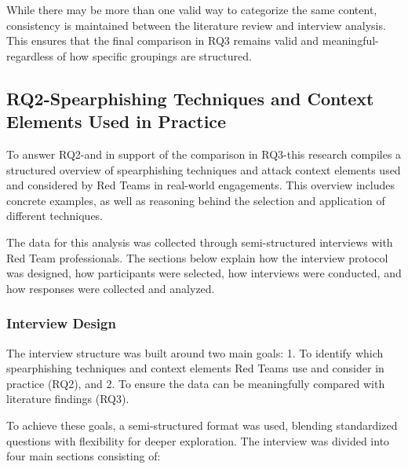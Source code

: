 While there may be more than one valid way to categorize the same content, consistency is maintained between the literature review and interview analysis. This ensures that the final comparison in RQ3 remains valid and meaningful-regardless of how specific groupings are structured.

\subsection{RQ2-Spearphishing Techniques and Context Elements Used in Practice}
To answer RQ2-and in support of the comparison in RQ3-this research compiles a structured overview of spearphishing techniques and attack context elements used and considered by Red Teams in real-world engagements. This overview includes concrete examples, as well as reasoning behind the selection and application of different techniques.

The data for this analysis was collected through semi-structured interviews with Red Team professionals. The sections below explain how the interview protocol was designed, how participants were selected, how interviews were conducted, and how responses were collected and analyzed.

\subsubsection{Interview Design}
The interview structure was built around two main goals:
1. To identify which spearphishing techniques and context elements Red Teams use and consider in practice (RQ2), and
2. To ensure the data can be meaningfully compared with literature findings (RQ3).

To achieve these goals, a semi-structured format was used, blending standardized questions with flexibility for deeper exploration. The interview was divided into four main sections consisting of:
